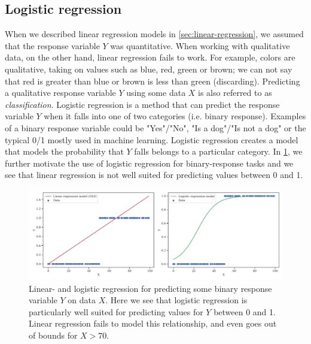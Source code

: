 \subsection{Logistic regression}
When we described linear regression models in \cref{sec:linear-regression}, we assumed that the response variable $Y$ was quantitative. When working with qualitative data, on the other hand, linear regression fails to work. For example, colors are qualitative, taking on values such as blue, red, green or brown; we can not say that red is greater than blue or brown is less than green (discarding). Predicting a qualitative response variable $Y$ using some data $X$ is also referred to as \textit{classification}. Logistic regression is a method that can predict the response variable $Y$ when it falls into one of two categories (i.e. binary response). Examples of a binary response variable could be "Yes"/"No", "Is a dog"/"Is not a dog" or the typical 0/1 mostly used in machine learning. Logistic regression creates a model that models the probability that $Y$ falls belongs to a particular category. In \cref{fig:logistic-regression-example}, we further motivate the use of logistic regression for binary-response tasks and we see that linear regression is not well suited for predicting values between 0 and 1.
\begin{figure}[H]
    \centering
    \includegraphics[width=\textwidth]{thesis/figures/logistic-regression-example.pdf}
    \caption{Linear- and logistic regression for predicting some binary response variable $Y$ on data $X$. Here we see that logistic regression is particularly well suited for predicting values for $Y$ between 0 and 1. Linear regression fails to model this relationship, and even goes out of bounds for $X > 70$.}
    \label{fig:logistic-regression-example}
\end{figure}


